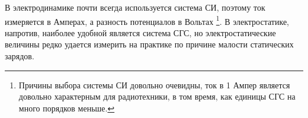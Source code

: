
В электродинамике почти всегда используется система СИ, поэтому ток измеряется в Амперах, а разность потенциалов в Вольтах \footnote{Причины выбора системы СИ довольно очевидны, ток в 1 Ампер является довольно характерным для радиотехники, в том время, как единицы СГС на много порядков меньше.}. В электростатике, напротив, наиболее удобной является система СГС, но электростатические величины редко удается измерить на практике по причине малости статических зарядов.
